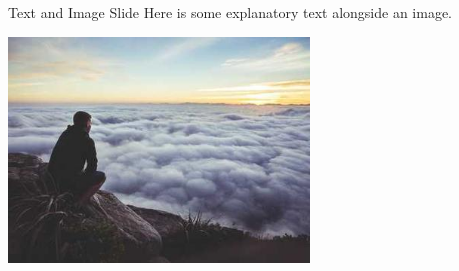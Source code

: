 \documentclass[aspectratio=169, notes]{beamer}
\begin{document}
\begin{frame}{Text and Image Slide}
    Here is some explanatory text alongside an image.
    \begin{center}
        \includegraphics[width=0.6\textwidth]{Images/image1.jpg}
    \end{center}
\end{frame}
\end{document}
